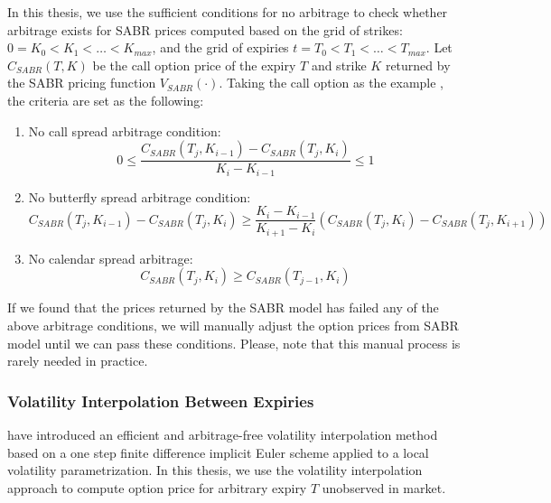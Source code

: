 \documentclass[letterpaper,12pt,titlepage,oneside,final]{book}
\numberwithin{equation}{section}
\theoremstyle{definition}
\begin{document}
In this thesis, we use the sufficient conditions for no arbitrage \cite{carr2005note} to check whether arbitrage exists for SABR prices computed based on  the grid of strikes: $0=K_0<K_1<\dots<K_{max}$, and the grid of expiries $t=T_0 < T_1 < \dots< T_{max} $. Let $C_{SABR}(T,K)$ be the call option price of  the expiry $T$ and strike $K$ returned by the SABR pricing function $V_{SABR}(\cdot)$. Taking the call option as the example , the criteria are set as the following: 
\begin{enumerate}
	\item No call spread arbitrage condition:
\[
0 \leq \frac{C_{SABR}(T_{j},K_{i-1})-C_{SABR}(T_{j},K_{i})}{K_i-K_{i-1}} \leq 1
\]

	\item  No butterfly spread arbitrage condition:
	 \[
	C_{SABR}(T_{j},K_{i-1})-C_{SABR}(T_{j},K_{i}) \geq \frac{K_i-K_{i-1}}{K_{i+1}-K_{i}}
	\left( C_{SABR}(T_{j},K_{i})-C_{SABR}(T_{j},K_{i+1})  \right)
	\]
	\item  No calendar spread arbitrage:
	\[
	C_{SABR}(T_{j},K_{i})\geq C_{SABR}(T_{j-1},K_{i})
	\]
\end{enumerate}

 
 If we found that the prices returned by the SABR model has failed any  of the above  arbitrage conditions, we will manually adjust the option prices from SABR model until we can pass these conditions. Please, note that this manual process is rarely needed in practice.

\subsubsection{Volatility Interpolation Between Expiries}
\citet{andreasen2010volatility} have introduced an efficient and arbitrage-free volatility interpolation method based on a one step finite difference implicit Euler scheme applied to a local volatility parametrization. In this thesis, we use the volatility interpolation approach to compute option price for arbitrary expiry $T$ unobserved in market.
\end{document}
